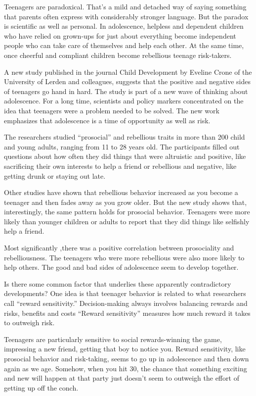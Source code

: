 Teenagers are paradoxical. That's a mild and detached way of saying something that parents often express with considerably stronger language. But the paradox is scientific as well as personal. In adolescence, helpless and dependent children who have relied on grown-ups for just about everything become independent people who can take care of themselves and help each other. At the same time, once cheerful and compliant children become rebellious teenage risk-takers.


A new study published in the journal Child Development by Eveline Crone of the University of Lerden and colleagues, suggests that the positive and negative sides of teenagers go hand in hard. The study is part of a new wave of thinking about adolescence. For a long time, scientists and policy markers concentrated on the idea that teenagers were a problem needed to be solved. The new work emphasizes that adolescence is a time of opportunity as well as risk.


The researchers studied ``prosocial'' and rebellious traits in more than 200 child and young adults, ranging from 11 to 28 years old. The participants filled out questions about how often they did things that were altruistic and positive, like sacrificing their own interests to help a friend or rebellious and negative, like getting drunk or staying out late.


Other studies have shown that rebellious behavior increased as you become a teenager and then fades away as you grow older. But the new study shows that, interestingly, the same pattern holds for prosocial behavior. Teenagers were more likely than younger children or adults to report that they did things like selfishly help a friend.


Most significantly ,there was a positive correlation between prosociality and rebelliousness. The teenagers who were more rebellious were also more likely to help others. The good and bad sides of adolescence seem to develop together.


Is there some common factor that underlies these apparently contradictory developments? One idea is that teenager behavior is related to what researchers call ``reward sensitivity.'' Decision-making always involves balancing rewards and risks, benefits and costs ``Reward sensitivity'' measures how much reward it takes to outweigh risk.


Teenagers are particularly sensitive to social rewards-winning the game, impressing a new friend, getting that boy to notice you. Reward sensitivity, like prosocial behavior and risk-taking, seems to go up in adolescence and then down again as we age. Somehow, when you hit 30, the chance that something exciting and new will happen at that party just doesn't seem to outweigh the effort of getting up off the conch.